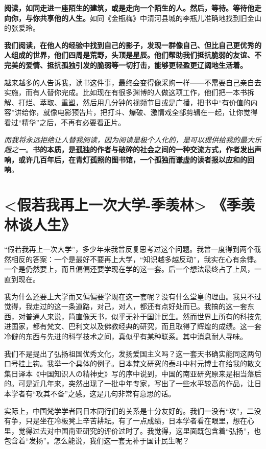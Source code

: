 \documentclass[UTF8,a4paper,8pt]{ctexart}
\begin{document}
 \textbf{阅读，如同走进一座陌生的建筑，或是走向一个陌生的人。然后，等待。等待他走向你，与你共享他的人生。}如同《金瓶梅》中清河县城的李瓶儿准确地找到旧金山的张爱玲。
 
 \textbf{我们阅读，在他人的经验中找到自己的影子，发现一群像自己、但比自己更优秀的人组成的世界，他们四周是荒野，头顶是星辰。他们帮助我们抵抗脆弱的友谊、不完美的爱情、抵抗孤独引发的脆弱等一切打击，能够更轻盈更辽阔地生活着。}
 
 越来越多的人告诉我，读书这件事，最终会变得像采购一样——不需要自己亲自去实施，而有人替你完成。比如现在有很多渊博的人做这项工作，他们把一本书拆解、打烂、萃取、重塑，然后用几分钟的视频节目或是广播，把书中“有价值的内容”讲给你，就像电影预告片，把打斗、爆破、激情戏全部剪辑在一起，让你觉得看过“精华”之后，不再有必要看正片。
 
 \textit{而我将永远拒绝让人替我阅读，因为阅读是极个人化的，是可以提供给我的最大乐趣之一}。\textbf{书的本质，是孤独的作者与破碎的社会之间的一种交流方式，作者发出声响，或许几百年后，在青灯孤照的图书馆，一个孤独而谦虚的读者报以应和的回响}。
 
 \newpage
 \section{<假若我再上一次大学-季羡林> 《季羡林谈人生》}
 
 “假若我再上一次大学”，多少年来我曾反复思考过这个问题。我曾一度得到两个截然相反的答案：一个是最好不要再上大学，“知识越多越反动”，我实在心有余悸。一个是仍然要上，而且偏偏还要学现在学的这一套。后一个想法最终占了上风，一直到现在。
 
 我为什么还要上大学而又偏偏要学现在这一套呢？没有什么堂皇的理由。我只不过觉得，我走过的这一条道路，对己，对人，都还有点好处而已。我搞的这一套东西，对普通人来说，简直像天书，似乎无补于国计民生。然而世界上所有的科技先进国家，都有梵文、巴利文以及佛教经典的研究，而且取得了辉煌的成绩。这一套冷僻的东西与先进的科学技术之间，真似乎有某种联系。其中消息耐人寻味。
 
 我们不是提出了弘扬祖国优秀文化，发扬爱国主义吗？这一套天书确实能同这两句口号挂上钩。我举一个具体的例子。日本梵文研究的泰斗中村元博士在给我的散文集日译本《中国知识人の精神史》写的序中说到，中国的南亚研究原来是相当落后的。可是近几年来，突然出现了一批中年专家，写出了一些水平较高的作品，让日本学者有“攻其不备”之感。这是几句非常有意思的话。
 
 实际上，中国梵学学者同日本同行们的关系是十分友好的。我们一没有“攻”，二没有争，只是坐在冷板凳上辛苦耕耘。有了一点成绩，日本学者看在眼里，想在心里，觉得过去对中国南亚研究的评价过时了。我觉得，这里面既包含着“弘扬”，也包含着“发扬”。怎么能说，我们这一套无补于国计民生呢？
 
\end{document}
